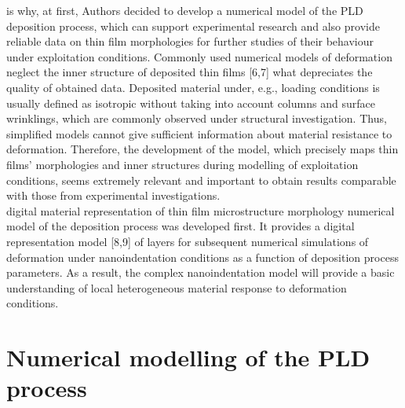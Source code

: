 \documentclass[journal,article,submit,pdftex,moreauthors]{Definitions/mdpi}
\begin{document}
 is why, at first, Authors decided to develop a numerical model of the PLD deposition process, which can support experimental research and also provide reliable data on thin film morphologies for further studies of their behaviour under exploitation conditions. Commonly used numerical models of deformation neglect the inner structure of deposited thin films [6,7] what depreciates the quality of obtained data. Deposited material under, e.g., loading conditions is usually defined as isotropic without taking into account columns and surface wrinklings, which are commonly observed under structural investigation. Thus, simplified models cannot give sufficient information about material resistance to deformation. Therefore, the development of the model, which precisely maps thin films' morphologies and inner structures during modelling of exploitation conditions, seems extremely relevant and important to obtain results comparable with those from experimental investigations.\\
 digital material representation of thin film microstructure morphology numerical model of the deposition process was developed first. It provides a digital representation model [8,9] of layers for subsequent numerical simulations of deformation under nanoindentation conditions as a function of deposition process parameters. As a result, the complex nanoindentation model will provide a basic understanding of local heterogeneous material response to deformation conditions.
\section{Numerical modelling of the PLD process}
 
\end{document}
